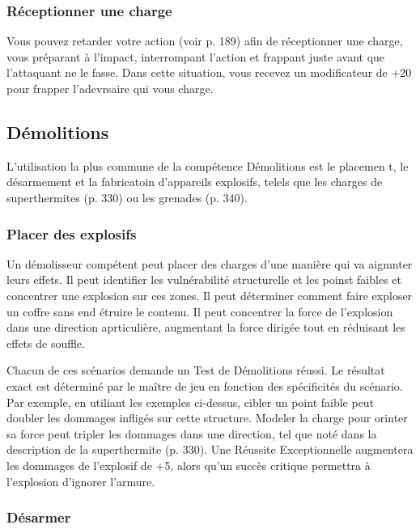 \subsubsection{Réceptionner une charge} 

Vous pouvez retarder votre action (voir p. 189) afin de réceptionner une charge, vous préparant à l'impact, interrompant l'action et frappant juste avant que l'attaquant ne le fasse. Dans cette situation, vous recevez un modificateur de +20 pour frapper l'adevrsaire qui vous charge. 



\subsection{Démolitions} \label{sec:demolitions} 

L'utilisation la plus commune de la compétence Démolitions est le placemen t, le désarmement et la fabricatoin d'appareils explosifs, telels que les charges de superthermites (p. 330) ou les grenades (p. 340). 

\subsubsection{Placer des explosifs} 

Un démolisseur compétent peut placer des charges d'une manière qui va aigmnter leurs effets. Il peut identifier les vulnérabilité structurelle et les poinst faibles et concentrer une explosion sur ces zones. Il peut déterminer comment faire exploser un coffre sans end étruire le contenu. Il peut concentrer la force de l'explosion dans une direction aprticulière, augmentant la force dirigée tout en réduisant les effets de souffle. 

Chacun de ces scénarios demande un Test de Démolitions réussi. Le résultat exact est déterminé par le maître de jeu en fonction des spécificités du scénario. Par exemple, en utiliant les exemples ci-dessus, cibler un point faible peut doubler les dommages infligés sur cette structure. Modeler la charge pour orinter sa force peut tripler les dommages dans une direction, tel que noté dans la description de la superthermite (p. 330). Une Réussite Exceptionnelle augmentera les dommages de l'explosif de +5, alors qu'un succès critique permettra à l'explosion d'ignorer l'armure. 

\subsubsection{Désarmer} 

